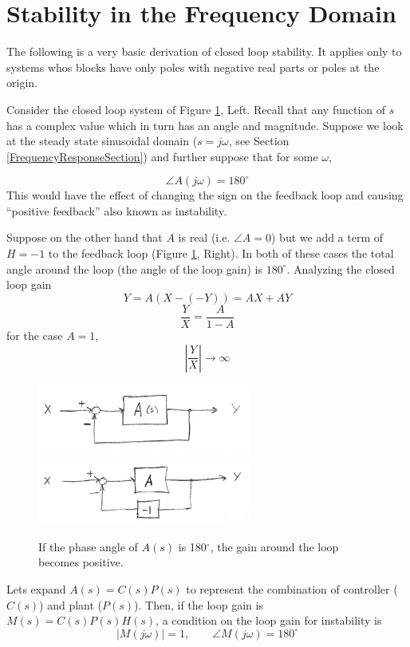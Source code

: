 \section{Stability in the Frequency Domain}



The following is a very basic derivation of closed loop stability.  It applies only to systems whos blocks have only poles with negative real parts or poles at the origin.

Consider the closed loop system of Figure \ref{NyquistLoop}, Left.  Recall that any function of $s$ has a complex value which in turn has an angle and magnitude.  Suppose we look at the steady state sinusoidal domain ($s=j\omega$, see Section \ref{FrequencyResponseSection}) and further suppose that for some $\omega$,

$$
\angle A(j\omega) = 180^\circ
$$
This would have the effect of changing the sign on the feedback loop and causing ``positive
 feedback'' also known as instability.


Suppose on the other hand that $A$ is real (i.e. $\angle A = 0$) but we add a term of $H=-1$ to the feedback loop (Figure \ref{NyquistLoop}, Right).  In both of these cases the total angle around the loop (the angle of the loop gain) is $180^\circ$.    Analyzing the closed loop gain
\[
Y = A(X-(-Y)) = AX + AY
\]
\[
\frac{Y}{X}  = \frac {A} {1-A}
\]
for the case $A=1$,
\[
|\frac{Y}{X}| \to \infty
\]


\begin{figure}\centering
\includegraphics[width=2.75in]{figs06/00792a.png}
\includegraphics[width=2.75in]{figs06/00793a.png}
\caption{If the phase angle of $A(s)$ is 180$^\circ$, the gain around the loop becomes positive.}\label{NyquistLoop}
\end{figure}

Lets expand $A(s) = C(s)P(s)$ to represent the combination of controller ($C(s)$) and
plant ($P(s)$). Then, if the loop gain is $M(s) = C(s)P(s)H(s)$, a condition on the loop gain for instability is
\[
\left | M(j\omega) \right | = 1, \qquad \angle M(j\omega) = 180^\circ
\]

